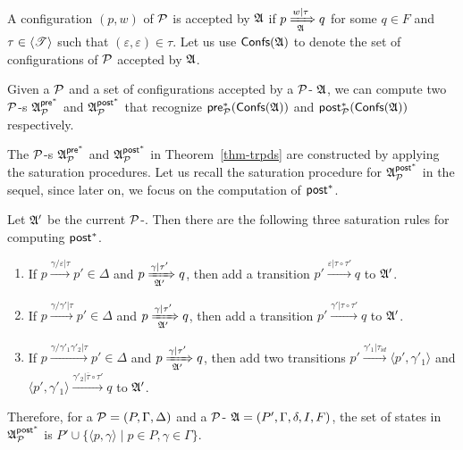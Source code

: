 A configuration $(p, w)$ of ${\mathcal{P} }$ is accepted by ${\mathfrak{A} }$ if $p \xRightarrow[{\mathfrak{A} }]{w | \tau} q$ for some $q \in F$ and $\tau \in \langle {\mathscr{T} } \rangle$ such that $(\varepsilon, \varepsilon) \in \tau$.
%
Let us use ${\mathsf{Confs} }({\mathfrak{A} })$ to denote the set of configurations of ${\mathcal{P} }$ accepted by ${\mathfrak{A} }$.


\begin{theorem}\label{thm-trpds}
	Given  a {\TrPDS} ${\mathcal{P} }$ and a set of configurations accepted by a ${\mathcal{P} }$-{\TrNFA} ${\mathfrak{A} }$, we can compute two ${\mathcal{P} }$-{\TrNFA}s ${\mathfrak{A} }^{{\mathsf{pre} }^*}_{{\mathcal{P} }}$  and ${\mathfrak{A} }^{{\mathsf{post} }^*}_{{\mathcal{P} }}$ that recognize ${\mathsf{pre} }^*_{\mathcal{P} }({\mathsf{Confs} }({\mathfrak{A} }))$ and ${\mathsf{post} }^*_{\mathcal{P} }({\mathsf{Confs} }({\mathfrak{A} }))$ respectively.
\end{theorem}

The ${\mathcal{P} }$-{\TrNFA}s ${\mathfrak{A} }^{{\mathsf{pre} }^*}_{{\mathcal{P} }}$ and ${\mathfrak{A} }^{{\mathsf{post} }^*}_{{\mathcal{P} }}$ in Theorem~\ref{thm-trpds} are constructed by applying the saturation procedures. Let us recall the saturation procedure for ${\mathfrak{A} }^{{\mathsf{post} }^*}_{{\mathcal{P} }}$ in the sequel, since later on, we focus on the computation of ${\mathsf{post} }^*$.

Let ${\mathfrak{A} }'$ be the current ${\mathcal{P} }$-\TrNFA. Then there are the following three saturation rules for computing ${\mathsf{post} }^*$. 

\smallskip
\fbox
{
\begin{minipage}{0.9\textwidth}
\begin{enumerate}
    \item If $p \xrightarrow{\gamma/\varepsilon | \tau} p' \in \Delta$ and $p \xRightarrow[{\mathfrak{A} }']{\gamma | \tau' } q$, then add a transition $p' \xrightarrow{\varepsilon | \tau \circ \tau'} q$ to ${\mathfrak{A} }'$. 
%
    \item If $p \xrightarrow{\gamma/\gamma' | \tau} p' \in \Delta$ and $p \xRightarrow[{\mathfrak{A} }']{\gamma | \tau' } q$, then add a transition $p' \xrightarrow{\gamma' | \tau \circ \tau'} q$ to ${\mathfrak{A} }'$. 
%
    \item If $p \xrightarrow{\gamma/\gamma'_1 \gamma'_2 | \tau} p' \in \Delta$ and $p \xRightarrow[{\mathfrak{A} }']{\gamma | \tau' } q$, then add two transitions $p' \xrightarrow{\gamma'_1 | \tau_{id}} \langle p', \gamma'_1\rangle$ and $\langle p', \gamma'_1\rangle \xrightarrow{\gamma'_2 | \overline{\tau} \circ \tau' } q$ to ${\mathfrak{A} }'$.  
\end{enumerate}
\end{minipage}
}

\smallskip

Therefore, for a {\TrPDS} ${\mathcal{P} }=(P,\Gamma,\Delta)$ and a ${\mathcal{P} }$-{\TrNFA} ${\mathfrak{A} } = (P', \Gamma, \delta, I, F)$, the set of states in ${\mathfrak{A} }^{{\mathsf{post} }^*}_{\mathcal{P} }$ is $P' \cup \{\langle p, \gamma \rangle \mid p \in P, \gamma \in \Gamma \}$.



